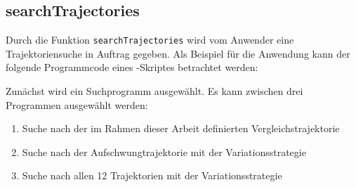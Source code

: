 \subsection{searchTrajectories}\label{subsec:searchtrj}

Durch die Funktion \texttt{searchTrajectories} wird vom Anwender eine Trajektoriensuche in Auftrag gegeben. Als Beispiel für die Anwendung kann der folgende Programmcode eines \Matlab-Skriptes betrachtet werden:



Zunächst wird ein Suchprogramm ausgewählt. Es kann zwischen drei Programmen ausgewählt werden:

\begin{enumerate}
	\item Suche nach der im Rahmen dieser Arbeit definierten Vergleichstrajektorie
	\item Suche nach der Aufschwungtrajektorie mit der Variationsstrategie
	\item Suche nach allen 12 Trajektorien mit der Variationsstrategie
\end{enumerate}


